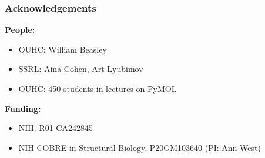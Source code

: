 \begin{frame}
\frametitle{Acknowledgements}
    \textbf{People:}
\begin{itemize}
    \item OUHC: William Beasley
    \item SSRL: Aina Cohen, Art Lyubimov
    \item OUHC: 450 students in lectures on PyMOL
\end{itemize}
    \textbf{Funding:}
\begin{itemize}    
    \item NIH: R01 CA242845
    \item NIH COBRE in Structural Biology, P20GM103640 (PI: Ann West)
\end{itemize}
\end{frame}




